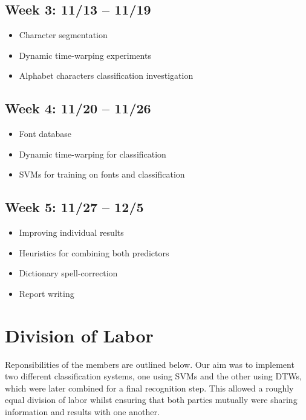 \documentclass[12pt]{article}
\begin{document}
		\subsection*{Week 3: 11/13 -- 11/19}
			\begin{itemize}
				\item{Character segmentation}
				\item{Dynamic time-warping experiments}
				\item{Alphabet characters classification investigation}
			\end{itemize}
		\subsection*{Week 4: 11/20 -- 11/26}
			\begin{itemize}
				\item{Font database}
				\item{Dynamic time-warping for classification}
				\item{SVMs for training on fonts and classification}
			\end{itemize}
		\subsection*{Week 5: 11/27 -- 12/5}
			\begin{itemize}
				\item{Improving individual results}
				\item{Heuristics for combining both predictors}
				\item{Dictionary spell-correction}
				\item{Report writing}
			\end{itemize}

	\section{Division of Labor}
	Reponsibilities of the members are outlined below. Our aim was to implement two different classification systems, one using SVMs and the other using DTWs, which were later combined for a final recognition step. This allowed a roughly equal division of labor whilst ensuring that both parties mutually were sharing information and results with one another.
	
\end{document}
